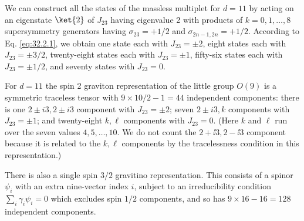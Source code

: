 We can construct all the states of the massless multiplet for \(d=11\)
by acting on an eigenstate \(\ket{2}\) of \(J_{23}\) having
eigenvalue 2 with products of \(k=0,1,\ldots,8\) supersymmetry generators
having \(\sigma_{23}=+1/2\) and \(\sigma_{2n-1,2n}=+1/2\). According to
Eq. \eqref{eq:32.2.1}, we obtain one state each with \(J_{23}=\pm2\),
eight states each with \(J_{23}=\pm3/2\), twenty-eight states each with
\(J_{23}=\pm1\), fifty-six states each with \(J_{23}=\pm1/2\), and
seventy states with \(J_{23}=0\).

For \(d=11\) the spin 2 graviton representation of the little group
\(O(9)\) is a symmetric traceless tensor with
\(9\times10/2-1=44\) independent components: there is one
\(2\mathbin{\pm}i3,2\mathbin{\pm}i3\) component with
\(J_{23}=\pm2\); seven \(2\mathbin{\pm}i3,k\) components with
\(J_{23}=\pm1\); and twenty-eight \(k,\ell\) components with
\(J_{23}=0\). (Here \(k\) and \(\ell\) run over the seven values
\(4,5,\ldots,10\). We do not count the
\(2+\ii3,2-\ii3\) component because it is related to the \(k,\ell\)
components by the tracelessness condition in this representation.)

There is also a single spin \(3/2\) gravitino representation. This
consists of a spinor \(\psi_i\) with an extra nine-vector index \(i\),
subject to an irreducibility condition \(\sum_i\gamma_i\psi_i=0\) which
excludes spin \(1/2\) components, and so has
\(9\times16-16=128\) independent components.

